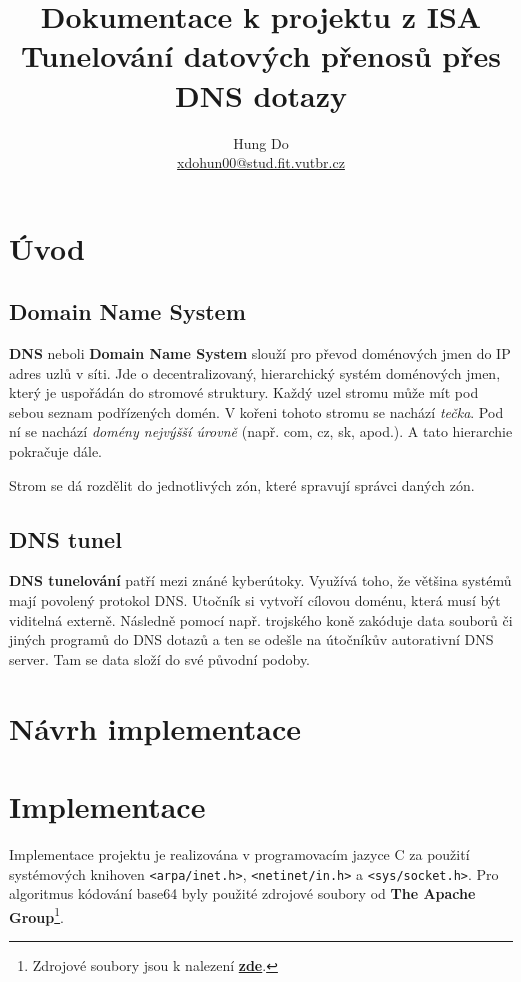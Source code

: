 \documentclass[a4paper,11pt]{article}
\title{Dokumentace k projektu z ISA \\
        \large Tunelování datových přenosů přes DNS dotazy}
\author{Hung Do \\ \href{mailto:xdohun00@stud.fit.vutbr.cz}{xdohun00@stud.fit.vutbr.cz}}
\begin{document}
    \maketitle
    \thispagestyle{empty}
    \newpage
    \tableofcontents
    \newpage
    \section{Úvod}
    \subsection{Domain Name System}
    \textbf{DNS} neboli \textbf{Domain Name System} slouží pro převod doménových jmen do IP adres uzlů v síti.
    Jde o decentralizovaný, hierarchický systém doménových jmen, který je uspořádán do stromové struktury.
    Každý uzel stromu může mít pod sebou seznam podřízených domén. V kořeni tohoto stromu se nachází \emph{tečka}.
    Pod ní se nachází \emph{domény nejvýšší úrovně} (např. com, cz, sk, apod.). A tato hierarchie pokračuje dále.

    Strom se dá rozdělit do jednotlivých zón, které spravují správci daných zón.
    \subsection{DNS tunel}
    \textbf{DNS tunelování} patří mezi znáné kyberútoky. Využívá toho, že většina systémů mají povolený protokol
    DNS. Utočník si vytvoří cílovou doménu, která musí být viditelná externě. Následně pomocí např. trojského koně
    zakóduje data souborů či jiných programů do DNS dotazů a ten se odešle na útočníkův autorativní DNS server.
    Tam se data složí do své původní podoby.\cite{DnsTunnel}

    \section{Návrh implementace}

    \section{Implementace}
    \label{sec:implementace}
    Implementace projektu je realizována v programovacím jazyce C za použití systémových knihoven
    \verb|<arpa/inet.h>|, \verb|<netinet/in.h>| a \verb|<sys/socket.h>|. Pro algoritmus kódování
    base64 byly použité zdrojové soubory od \textbf{The Apache Group}\footnote{Zdrojové soubory jsou k nalezení \href{https://opensource.apple.com/source/QuickTimeStreamingServer/QuickTimeStreamingServer-452/CommonUtilitiesLib/}{\textbf{zde}}.}.
\end{document}
